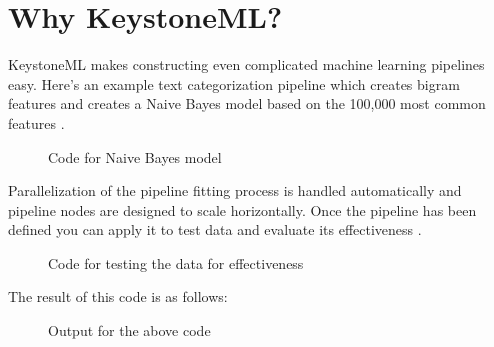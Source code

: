 \documentclass[9pt,twocolumn,twoside]{../../styles/osajnl}
\begin{document}
\section{Why KeystoneML?}

KeystoneML makes constructing even complicated machine learning
pipelines easy. Here’s an example text categorization pipeline which
creates bigram features and creates a Naive Bayes model based on the
100,000 most common features \cite{www-keystoneml1} .

\begin{figure}[htbp]
\centering
{}
\caption{Code for Naive Bayes model}
\label{fig:Code for Naive Bayes model}
\end{figure}


Parallelization of the pipeline fitting
process is handled automatically and pipeline nodes are designed to
scale horizontally. Once the pipeline has been defined you can apply
it to test data and evaluate its effectiveness \cite{www-keystoneml} .

\begin{figure}[htbp]
\centering
{}
\caption{Code for testing the data for effectiveness}
\label{fig:Code for testing the data for effectiveness}
\end{figure}


The result of this code is as follows:

\begin{figure}[htbp]
\centering
{}
\caption{Output for the above code}
\label{fig:Output for the above code}
\end{figure}
\end{document}
